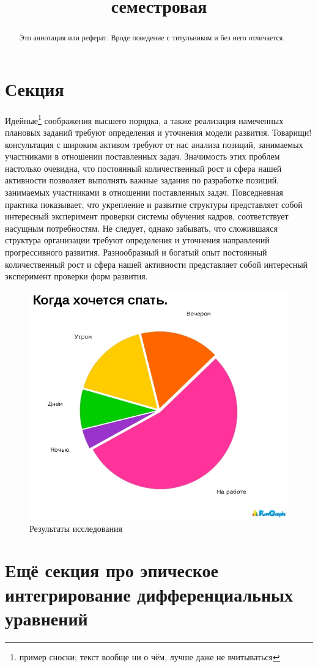 \documentclass[titlepage]{hedsemwork}
\begin{document}
\title{семестровая}
\maketitle
\tableofcontents
\begin{abstract}
    Это аннотация или реферат. Вроде поведение с титульником и без него
    отличается.
\end{abstract}
\section{Секция}
Идейные\footnote{пример сноски; текст вообще ни о чём, лучше даже не
вчитываться} соображения высшего порядка, а также реализация намеченных плановых заданий требуют определения и уточнения модели развития. Товарищи! консультация с широким активом требуют от нас анализа позиций, занимаемых участниками в отношении поставленных задач. Значимость этих проблем настолько очевидна, что постоянный количественный рост и сфера нашей активности позволяет выполнять важные задания по разработке позиций, занимаемых участниками в отношении поставленных задач. Повседневная практика показывает, что укрепление и развитие структуры представляет собой интересный эксперимент проверки системы обучения кадров, соответствует насущным потребностям. Не следует, однако забывать, что сложившаяся структура организации требуют определения и уточнения направлений прогрессивного развития. Разнообразный и богатый опыт постоянный количественный рост и сфера нашей активности представляет собой интересный эксперимент проверки форм развития.
\begin{figure}[t]
    \center
    \includegraphics[width=.47\textwidth]{1.jpg}
    \caption{Результаты исследования}
\end{figure}
\section{Ещё секция про эпическое интегрирование дифференциальных
уравнений}
\end{document}
